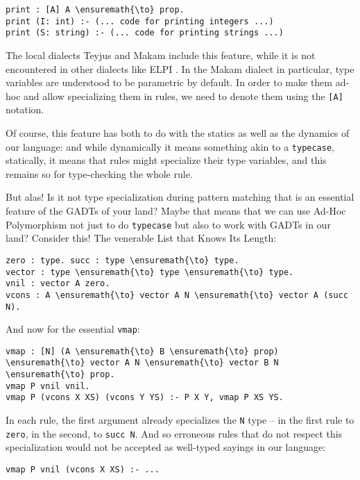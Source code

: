 \begin{verbatim}
print : [A] A \ensuremath{\to} prop.
print (I: int) :- (... code for printing integers ...)
print (S: string) :- (... code for printing strings ...)
\end{verbatim}

The local dialects Teyjus
\citep{teyjus-main-reference,teyjus-2-implementation} and Makam include
this feature, while it is not encountered in other dialects like ELPI
\citep{elpi-main-reference}. In the Makam dialect in particular, type
variables are understood to be parametric by default. In order to make
them ad-hoc and allow specializing them in rules, we need to denote them
using the \texttt{{[}A{]}} notation.

Of course, this feature has both to do with the statics as well as the
dynamics of our language: and while dynamically it means something akin
to a \texttt{typecase}, statically, it means that rules might specialize
their type variables, and this remains so for type-checking the whole
rule.

But alas! Is it not type specialization during pattern matching that is
an essential feature of the GADTs of your land? Maybe that means that we
can use Ad-Hoc Polymorphism not just to do \texttt{typecase} but also to
work with GADTs in our land? Consider this! The venerable List that
Knows Its Length:

\begin{verbatim}
zero : type. succ : type \ensuremath{\to} type.
vector : type \ensuremath{\to} type \ensuremath{\to} type.
vnil : vector A zero.
vcons : A \ensuremath{\to} vector A N \ensuremath{\to} vector A (succ N).
\end{verbatim}

And now for the essential \texttt{vmap}:

\begin{verbatim}
vmap : [N] (A \ensuremath{\to} B \ensuremath{\to} prop) \ensuremath{\to} vector A N \ensuremath{\to} vector B N \ensuremath{\to} prop.
vmap P vnil vnil.
vmap P (vcons X XS) (vcons Y YS) :- P X Y, vmap P XS YS.
\end{verbatim}

In each rule, the first argument already specializes the \texttt{N} type
-- in the first rule to \texttt{zero}, in the second, to
\texttt{succ\ N}. And so erroneous rules that do not respect this
specialization would not be accepted as well-typed sayings in our
language:

\begin{verbatim}
vmap P vnil (vcons X XS) :- ...
\end{verbatim}

